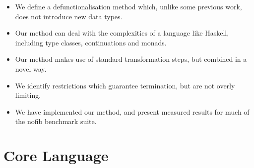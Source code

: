 \begin{itemize}
\item We define a defunctionalisation method which, unlike some previous work, does not introduce new data types.
\item Our method can deal with the complexities of a language like Haskell, including type classes, continuations and monads.
\item Our method makes use of standard transformation steps, but combined in a novel way.
\item We identify restrictions which guarantee termination, but are not overly limiting.
\item We have implemented our method, and present measured results for much of the nofib benchmark suite.
\end{itemize}

\section{Core Language}
\label{sec:core}


